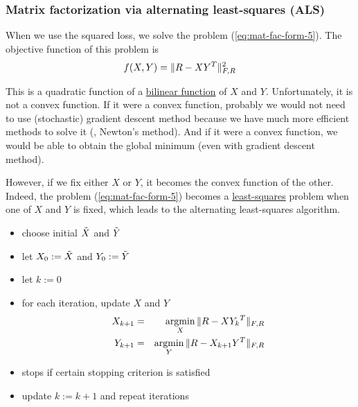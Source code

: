 \subsubsection{Matrix factorization via alternating least-squares (ALS)}

When we use the squared loss, we solve the problem (\ref{eq:mat-fac-form-5}).
The objective function of this problem is
\begin{equation}
\label{eq:vuwj}
f(X,Y) = \|R - XY^T\|_{F,R}^2
\end{equation}

This is a quadratic function of a \href{https://en.wikipedia.org/wiki/Bilinear_map}{bilinear function} of $X$ and $Y$.
Unfortunately, it is not a convex function. If it were a convex function, probably we would not need to use (stochastic) gradient descent method
because we have much more efficient methods to solve it (\eg, Newton's method).
And if it were a convex function, we would be able to obtain the global minimum (even with gradient descent method).


However, if we fix either $X$ or $Y$, it becomes the convex function of the other. Indeed, the problem (\ref{eq:mat-fac-form-5}) becomes
a \href{https://en.wikipedia.org/wiki/Least_squares}{least-squares} problem when one of $X$ and $Y$ is fixed,
which leads to the alternating least-squares algorithm.

\begin{itemize}
\item choose initial $\tilde{X}$ and $\tilde{Y}$
\item let ${{X}_{0}}:=\tilde{X}$ and ${{Y}_{0}}:=\tilde{Y}$
\item let $k:=0$
\item for each iteration, update $X$ and $Y$
\begin{eqnarray}
\label{eq:als-1}
    {{X}_{k+1}} &=& \mathop{\mathrm {argmin}}_X \|R-X{{{Y}_{k}}}^T\|_{F,R}
\\
\label{eq:als-2}
    {{Y}_{k+1}} &=& \mathop{\mathrm {argmin}}_Y \|R-{{X}_{k+1}}Y^T\|_{F,R}
\end{eqnarray}
\item stops if certain stopping criterion is satisfied
\item update $k:=k+1$ and repeat iterations
\end{itemize}

